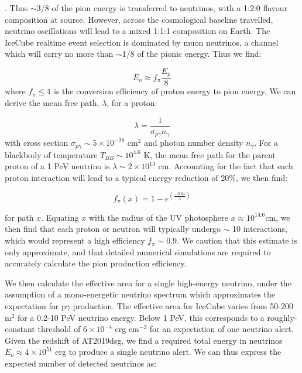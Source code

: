 . Thus $\sim$3/8 of the pion energy is transferred to neutrinos, with a 1:2:0 flavour composition at source. However, across the cosmological baseline travelled, neutrino oscillations will lead to a mixed 1:1:1 composition on Earth. The IceCube realtime event selection is dominated by muon neutrinos, a channel which will carry no more than $\sim$1/8 of the pionic energy. Thus we find:

\begin{equation}
E_{\nu} \approx f_{\pi} \frac{E_{p}}{8}
\end{equation} where $f_{\pi} \leq1$ is the conversion efficiency of proton energy to pion energy. We can derive the mean free path, $\lambda$, for a proton:

\begin{equation}
\lambda = \frac{1}{\sigma_{p\gamma} n_{\gamma}}
\end{equation} with cross section $\sigma_{p\gamma} \sim 5 \times 10^{-28}$ cm$^{2}$ and photon number density $n_{\gamma}$. For a blackbody of temperature $T_{BB} \sim 10^{4.6}$ K, the mean free path for the parent proton of a 1 PeV neutrino is $\lambda \sim 2 \times 10^{13}$ cm. Accounting for the fact that each proton interaction will lead to a typical energy reduction of 20\%, we then find:

\begin{equation}
f_{\pi}(x) = 1 - e^{\left( \frac{-0.2x}{\lambda} \right)}
\end{equation} 

for path $x$. Equating $x$ with the radius of the UV photosphere $x \approx 10^{14.6}$cm, we then find that each proton or neutron will typically undergo $\sim$ 10 interactions, which would represent a high efficiency $f_{\pi} \sim 0.9$. We caution that this estimate is only approximate, and that detailed numerical simulations are required to accurately calculate the pion production efficiency\cite{2010ApJ...721..630H}.

We then calculate the effective area for a single high-energy neutrino, under the assumption of a mono-energetic neutrino spectrum which approximates the expectation for p$\gamma$ production. The effective area for IceCube varies from 50-200 m$^{2}$ for a 0.2-10 PeV neutrino energy. Below 1 PeV, this corresponds to a roughly-constant threshold of $6 \times 10^{-4}$ erg cm$^{-2}$ for an expectation of one neutrino alert. Given the redshift of AT2019dsg, we find a required total energy in neutrinos $E_{\nu} \approx 4 \times 10^{51}$ erg to produce a single neutrino alert. 
We can thus express the expected number of detected neutrinos as:

